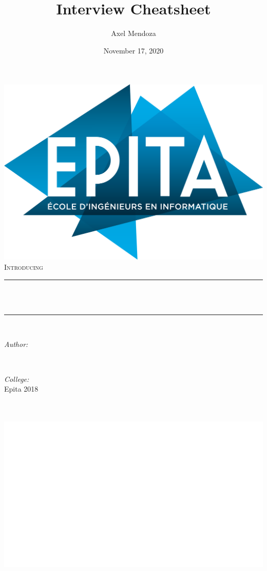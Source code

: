 \documentclass[12pt]{report}
\title{Interview Cheatsheet}								%
\author{Axel Mendoza}								%
\date{November 17, 2020}											%
\makeatletter
\let\thetitle\@title
\let\theauthor\@author
\let\thedate\@date
\makeatother
\begin{document}

\begin{titlepage}
	\centering
    \includegraphics[width=0.51\linewidth]{images/epita_logo.png}\\[2.0 cm]	%
    \textsc{\Large Introducing}\\[0.4 cm]
	\rule{\linewidth}{0.2 mm} \\[0.4 cm]
	{ \huge \bfseries \thetitle}\\
	\rule{\linewidth}{0.2 mm} \\[0.6 cm]
	
	\begin{minipage}{0.4\textwidth}
		\begin{flushleft} \large
			\emph{Author:}\\
			\theauthor
			\end{flushleft}
			\end{minipage}~
			\begin{minipage}{0.4\textwidth}
			\begin{flushright} \large
			\emph{College:} \\
            Epita 2018									%
		\end{flushright}
		
	\end{minipage}\\[0.6 cm]
	
	{\large \thedate}\\[2 cm]
    \includegraphics[width=0.45\linewidth]{images/58065.jpg}\\[2.0 cm]	%
	\vfill
	
\end{titlepage}
\end{document}
